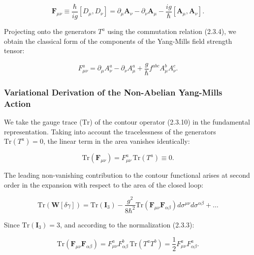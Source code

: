 \documentclass[11pt,a4paper]{article}
\theoremstyle{definition}
\begin{document}
\begin{equation}\label{eq:2.3.11}\tag{2.3.11}
\mathbf{F}_{\mu\nu} \equiv \frac{\hbar}{ig} \left[ D_\mu, D_\nu \right] = \partial_\mu \mathbf{A}_\nu - \partial_\nu \mathbf{A}_\mu - \frac{ig}{\hbar} \left[ \mathbf{A}_\mu, \mathbf{A}_\nu \right].
\end{equation}

Projecting onto the generators $T^a$ using the commutation relation (2.3.4), we obtain the classical form of the components of the Yang-Mills field strength tensor:

\begin{equation}\label{eq:2.3.12}\tag{2.3.12}
F_{\mu\nu}^a = \partial_\mu A_\nu^a - \partial_\nu A_\mu^a + \frac{g}{\hbar} f^{abc} A_\mu^b A_\nu^c.
\end{equation}

\subsubsection{Variational Derivation of the Non-Abelian Yang-Mills Action}\label{sec:2.3.3}

We take the gauge trace ($\text{Tr}$) of the contour operator (2.3.10) in the fundamental representation. Taking into account the tracelessness of the generators $\text{Tr}(T^a) = 0$, the linear term in the area vanishes identically:

\begin{equation}\label{eq:2.3.13}\tag{2.3.13}
\text{Tr}\left( \mathbf{F}_{\mu\nu} \right) = F_{\mu\nu}^a \, \text{Tr}(T^a) \equiv 0.
\end{equation}

The leading non-vanishing contribution to the contour functional arises at second order in the expansion with respect to the area of the closed loop:

\begin{equation}\label{eq:2.3.14}\tag{2.3.14}
\text{Tr}\left( \mathbf{W}[\delta\gamma] \right) = \text{Tr}(\mathbf{I}_3) - \frac{g^2}{8\hbar^2} \text{Tr}\left( \mathbf{F}_{\mu\nu} \mathbf{F}_{\alpha\beta} \right) d\sigma^{\mu\nu} d\sigma^{\alpha\beta} + \dots
\end{equation}

Since $\text{Tr}(\mathbf{I}_3) = 3$, and according to the normalization (2.3.3):

\begin{equation}\label{eq:2.3.15}\tag{2.3.15}
\text{Tr}\left( \mathbf{F}_{\mu\nu} \mathbf{F}_{\alpha\beta} \right) = F_{\mu\nu}^a F_{\alpha\beta}^b \, \text{Tr}(T^a T^b) = \frac{1}{2} F_{\mu\nu}^a F_{\alpha\beta}^a.
\end{equation}
\end{document}
